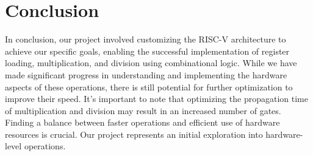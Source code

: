 \section{Conclusion}
In conclusion, our project involved customizing the RISC-V architecture to achieve our specific goals, enabling the successful implementation of register loading, multiplication, and division using combinational logic. While we have made significant progress in understanding and implementing the hardware aspects of these operations, there is still potential for further optimization to improve their speed. It's important to note that optimizing the propagation time of multiplication and division may result in an increased number of gates. Finding a balance between faster operations and efficient use of hardware resources is crucial. Our project represents an initial exploration into hardware-level operations.